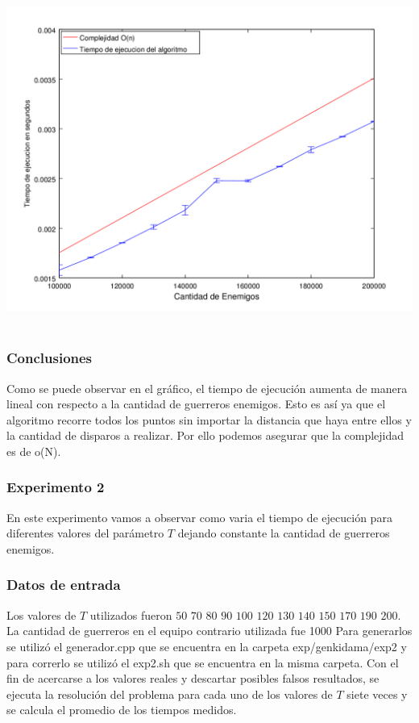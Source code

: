       	\includegraphics[height=11cm]{graficos/genkidama-exp1.png}


    	\subsubsection*{Conclusiones}
			Como se puede observar en el gráfico, el tiempo de ejecución aumenta de manera lineal con respecto a la cantidad de guerreros enemigos. Esto es así ya que el algoritmo recorre todos los puntos sin importar la distancia que haya entre ellos y la cantidad de disparos a realizar. Por ello podemos asegurar que la complejidad es de o(N).
			\\



		\subsubsection*{Experimento 2}\;
			En este experimento vamos a observar como varia el tiempo de ejecución para diferentes valores del parámetro $T$ dejando constante la cantidad de guerreros enemigos.\;


		\subsubsection*{Datos de entrada}

		
			Los valores de $T$ utilizados fueron $50$ $70$ $80$ $90$ $100$ $120$ $130$ $140$ $150$ $170$ $190$ $200$.\;
			La cantidad de guerreros en el equipo contrario utilizada fue 1000
			Para generarlos se utilizó el generador.cpp que se encuentra en la carpeta exp/genkidama/exp2 y para correrlo se utilizó el exp2.sh que se encuentra en la misma carpeta.\;
			Con el fin de acercarse a los valores reales y descartar posibles falsos resultados, se ejecuta la resolución del problema para cada uno de los valores de $T$ siete veces y se calcula el promedio de los tiempos medidos.\;
      	

